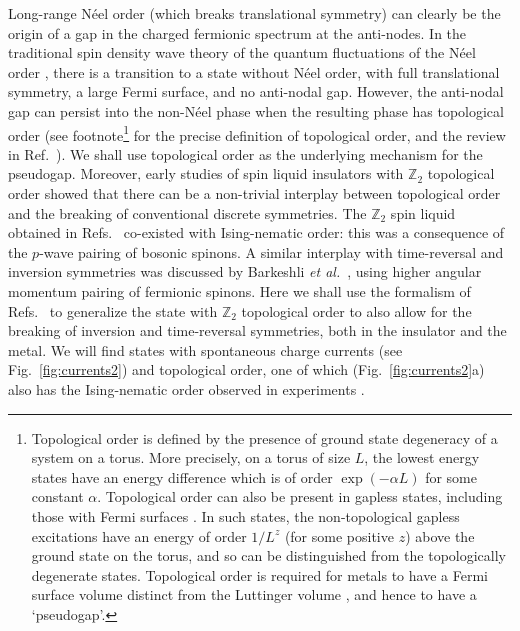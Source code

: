 \documentclass[aps,prb,preprint,onecolumn,citeautoscript,superscriptaddress,footinbib,
eqsecnum]{revtex4-1}
\begin{document}
Long-range N\'eel order (which breaks translational symmetry) can 
clearly be the origin of a gap in the charged fermionic spectrum at the anti-nodes. In the traditional
spin density wave theory of the quantum fluctuations of the N\'eel order \cite{hertz}, there is a transition to a state without
N\'eel order, with full translational symmetry, a large Fermi surface, and no anti-nodal gap.
However, the anti-nodal gap can 
persist into the non-N\'eel phase \cite{CScomment}
when the resulting phase has topological order \cite{FFL,TSMVSS04,APAV04,2015PNAS..112.9552P,2012PhRvB..85s5123P} (see footnote\footnote{
Topological order is defined by the presence of ground state degeneracy of a system on a torus. More precisely, on a torus of size $L$, the lowest energy states have an energy difference which is of
order $\exp (-\alpha L)$ for some constant $\alpha$. Topological order can also be present in gapless states, including those with Fermi surfaces \cite{FFL,TSMVSS04}. In such states, the non-topological gapless excitations
have an energy of order $1/L^z$ (for some positive $z$) above the ground state on the torus,
and so can be distinguished from the topologically degenerate states. Topological order is required
for metals to have a Fermi surface volume distinct from the Luttinger volume \cite{TSMVSS04}, and hence to have a
`pseudogap'.} for the precise definition of topological order, and the review in Ref.~). We shall use topological order as the
underlying mechanism for the pseudogap. 
Moreover, early studies of spin liquid insulators with $\mathbb{Z}_2$ topological order showed that there can be a non-trivial interplay between
topological order and the breaking of conventional discrete symmetries. 
The $\mathbb{Z}_2$ spin liquid obtained 
in Refs.~ co-existed with Ising-nematic order: this
was a consequence of the $p$-wave pairing of bosonic spinons.
A similar interplay
with time-reversal and inversion symmetries was discussed by Barkeshli {\it et al.}~\cite{2013PhRvB..87n0402B}, using higher angular momentum pairing
of fermionic spinons.
Here we shall use the formalism of Refs.~
to generalize the state \cite{NRSS91,SSNR91} with $\mathbb{Z}_2$ 
topological order to also allow for the breaking of inversion and time-reversal symmetries, both
in the insulator and the metal. We will find states with spontaneous charge currents
(see Fig.~\ref{fig:currents2}) and topological order, one of which (Fig.~\ref{fig:currents2}a) also has the Ising-nematic order observed in 
experiments \cite{2002PhRvL..88m7005A,Hinkov597,2010Natur.463..519D,2010Natur.466..347L}. 
\end{document}
